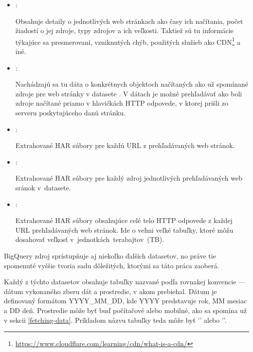 \begin{itemize}
    \item {}:

    Obsahuje detaily o jednotlivých web stránkach ako časy ich načítania, počet žiadostí o jej zdroje, typy zdrojov a ich veľkosti.
    Taktiež sú tu informácie týkajúce sa presmerovaní, vzniknutých chýb, použitých služieb ako CDN\footnote{\href{https://www.cloudflare.com/learning/cdn/what-is-a-cdn/}{https://www.cloudflare.com/learning/cdn/what-is-a-cdn/}} a iné.
    
    \item {}:

    Nachádzajú sa tu dáta o konkrétnych objektoch načítaných ako už spomínané zdroje pre web stránky v datasete .
    V dátach je možné prehľadávať ako boli zdroje načítané priamo v hlavičkách HTTP odpovede, v ktorej prišli zo serveru poskytujúceho danú stránku.
    
    \item {}:

    Extrahované HAR súbory pre každú URL z prehľadávaných web stránok.
    
    \item {}:

    Extrahované HAR súbory pre každý zdroj jednotlivých prehľadávaných web sránok \mbox{v  datasete}.
    
    \item {}:

    Extrahované HAR súbory obsahujúce celé telo HTTP odpovede z každej URL prehľadávaných web stránok.
    Ide o veľmi veľké tabuľky, ktoré môžu dosahovať veľkosť \mbox{v jednotkách terabajtov (TB)}.
\end{itemize}

BigQuery zdroj  sprístupňuje aj niekoľko ďalších datasetov, no práve tie spomenuté vyššie tvoria sadu dôležitých, ktorými sa táto práca zaoberá. 

Každý z týchto datasetov obsahuje tabuľky nazvané podľa rovnakej konvencie --- dátum vykonaného zberu dát a prostredie, v akom prebiehal.
Dátum je definovaný formátom YYYY\_MM\_DD, kde YYYY predstavuje rok, MM mesiac a DD deň. Prostredie môže byť buď počítačové alebo mobilné, ako sa spomína už v sekcii \ref{fetching-data}.
Príkladom názvu tabuľky teda môže byť '' alebo ''.

